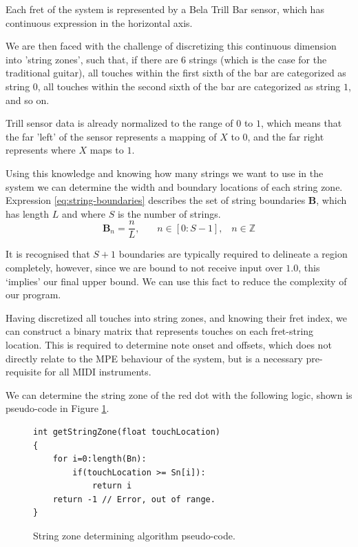 Each fret of the system is represented by a Bela Trill Bar sensor, which has continuous expression in the horizontal axis.

We are then faced with the challenge of discretizing this continuous dimension into 'string zones', such that, if there are 6 strings (which is the case for the traditional guitar), all touches within the first sixth of the bar are categorized as string $0$, all touches within the second sixth of the bar are categorized as string $1$, and so on. 

Trill sensor data is already normalized to the range of $0$ to $1$, which means that the far 'left' of the sensor represents a mapping of $X$ to $0$, and the far right represents where $X$ maps to $1$.

Using this knowledge and knowing how many strings we want to use in the system we can determine the width and boundary locations of each string zone. Expression \ref{eq:string-boundaries} describes the set of string boundaries $\mathbf{B}$, which has length  $L$ and where $S$ is the number of strings.
\begin{equation} \label{eq:string-boundaries}
\mathbf{B}_n = \frac{n}{L}, \: \: \: \: \: \: \: \: n \in [0:S-1], \; \; \;  n \in \mathbb{Z}
\end{equation}

It is recognised that $S + 1$ boundaries are typically required to delineate a region completely, however, since we are bound to not receive input over $1.0$, this `implies' our final upper bound. We can use this fact to reduce the complexity of our program.

Having discretized all touches into string zones, and knowing their fret index, we can construct a binary matrix that represents touches on each fret-string location. This is required to determine note onset and offsets, which does not directly relate to the MPE behaviour of the system, but is a necessary pre-requisite for all MIDI instruments.



We can determine the string zone of the red dot with the following logic, shown is pseudo-code in Figure \ref{fig:getStringZone}. 
\begin{figure}[h]
    \centering
    \begin{verbatim}
int getStringZone(float touchLocation)
{
    for i=0:length(Bn):
        if(touchLocation >= Sn[i]):
            return i
    return -1 // Error, out of range. 
}
\end{verbatim}
    \caption{String zone determining algorithm pseudo-code.}
    \label{fig:getStringZone}
\end{figure}


